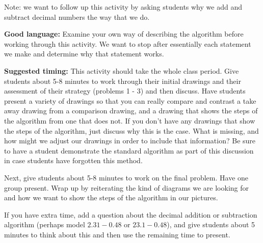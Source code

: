 \documentclass[nooutcomes,noauthor, handout]{ximera}
\begin{document}
\begin{instructorNotes}
Note: we want to follow up this activity by asking students why we add and subtract decimal numbers the way that we do.


{\bf Good language:}  Examine your own way of describing the algorithm before working through this activity. We want to stop after essentially each statement we make and determine why that statement works.


{\bf Suggested timing:} This activity should take the whole class period. Give students about 5-8 minutes to work through their initial drawings and their assessment of their strategy (problems 1 - 3) and then discuss. Have students present a variety of drawings so that you can really compare and contrast a take away drawing from a comparison drawing, and a drawing that shows the steps of the algorithm from one that does not. If you don't have any drawings that show the steps of the algorithm, just discuss why this is the case. What is missing, and how might we adjust our drawings in order to include that information? Be sure to have a student demonstrate the standard algorithm as part of this discussion in case students have forgotten this method.

Next, give students about 5-8 minutes to work on the final problem. Have one group present. Wrap up by reiterating the kind of diagrams we are looking for and how we want to show the steps of the algorithm in our pictures.


If you have extra time, add a question about the decimal addition or subtraction algorithm (perhaps model $2.31 - 0.48$ or $23.1 - 0.48$), and give students about 5 minutes to think about this and then use the remaining time to present.


\end{instructorNotes}
\end{document}
